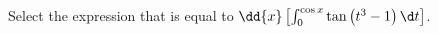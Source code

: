 \documentclass{ximera}
\author{Nela Lakos \and Kyle Parsons}
\begin{document}
\begin{exercise}

Select the expression that is equal to $\dd{x}\left[\int_0^{\cos x} \tan\left(t^3-1\right)\d t\right]$.
\begin{multipleChoice}
\end{multipleChoice}

\end{exercise}
\end{document}
